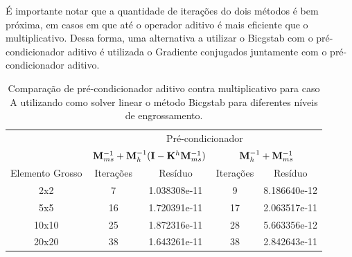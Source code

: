 É importante notar que a quantidade de iterações do dois métodos é bem próxima, em casos em que até o operador aditivo é mais eficiente que o multiplicativo. Dessa forma, uma alternativa a utilizar o Bicgstab com o pré-condicionador aditivo é utilizada o Gradiente conjugados juntamente com o pré-condicionador aditivo.

\begin{table}[]
    \caption{Comparação de pré-condicionador aditivo contra multiplicativo para caso A utilizando como solver linear o método Bicgstab para diferentes níveis de engrossamento.}
    \label{table:precondcasoAcomp}
    \begin{tabular}{c|c|c|c|l|}

    \cline{2-5}
                                          & \multicolumn{4}{c|}{Pré-condicionador}                                                        \\ \cline{2-5} 
                                          & \multicolumn{2}{c|}{$\mathbf{M}^{-1}_{ms} +\mathbf{M}^{-1}_{h}(\mathbf{I}- \mathbf{K}^h \mathbf{M}^{-1}_{ms})$}               & \multicolumn{2}{c|}{$\mathbf{M}^{-1}_{h} + \mathbf{M}^{-1}_{ms}$}                \\ \hline
    \multicolumn{1}{|c|}{Elemento Grosso} & Iterações & \multicolumn{1}{c|}{Resíduo}      & Iterações & \multicolumn{1}{c|}{Resíduo}      \\ \hline
    \multicolumn{1}{|c|}{2x2}             & 7         & \multicolumn{1}{c|}{1.038308e-11} & 9         & \multicolumn{1}{c|}{8.186640e-12} \\ \hline
    \multicolumn{1}{|c|}{5x5}             & 16        & 1.720391e-11                      & 17        & 2.063517e-11                      \\ \hline
    \multicolumn{1}{|c|}{10x10}           & 25        & 1.872316e-11                      & 28        & 5.663356e-12                      \\ \hline
    \multicolumn{1}{|c|}{20x20}           & 38        & 1.643261e-11                      & 38        & 2.842643e-11                      \\ \hline
    \end{tabular}
\end{table}


